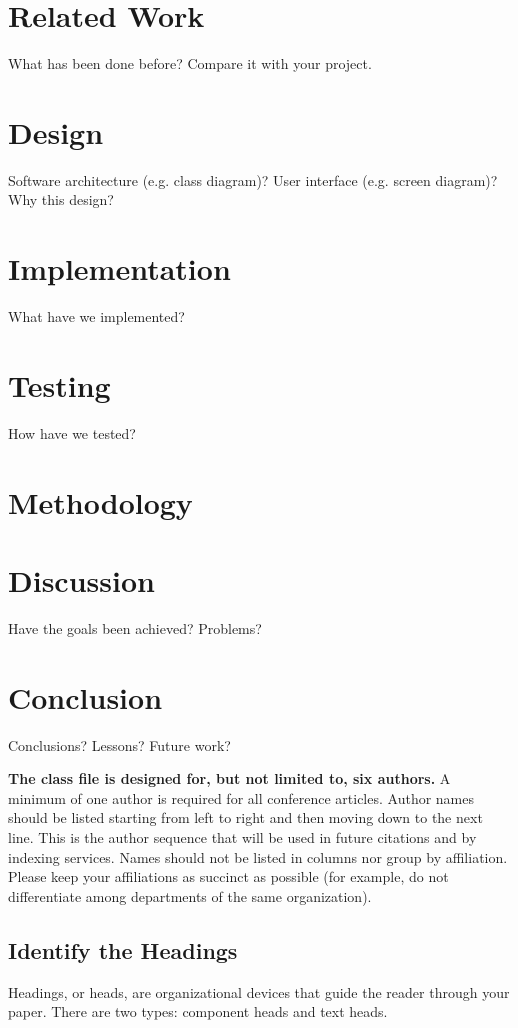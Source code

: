 \documentclass[conference]{IEEEtran}
\begin{document}
\section{Related Work}
What has been done before? Compare it with your project.

\section{Design}
Software architecture (e.g. class diagram)? User interface (e.g. screen diagram)? Why this design?

\section{Implementation}
What have we implemented?

\section{Testing}
How have we tested?

\section{Methodology}

\section{Discussion}
Have the goals been achieved? Problems?

\section{Conclusion}
Conclusions? Lessons? Future work?


\textbf{The class file is designed for, but not limited to, six authors.} A 
minimum of one author is required for all conference articles. Author names 
should be listed starting from left to right and then moving down to the 
next line. This is the author sequence that will be used in future citations 
and by indexing services. Names should not be listed in columns nor group by 
affiliation. Please keep your affiliations as succinct as possible (for 
example, do not differentiate among departments of the same organization).

\subsection{Identify the Headings}
Headings, or heads, are organizational devices that guide the reader through 
your paper. There are two types: component heads and text heads.
\end{document}
